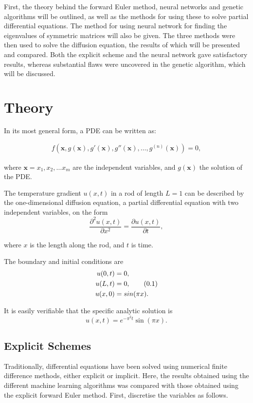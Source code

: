 \documentclass[multicolumn, 9pt]{extarticle}
\newcommand\numberthis{\addtocounter{equation}{1}\tag{\theequation}}
\begin{document}
First, the theory behind the forward Euler method, neural networks and genetic algorithms will be outlined, as well as the methods for using these to solve partial differential equations. The method for using neural network for finding the eigenvalues of symmetric matrices will also be given. The three methods were then used to solve the diffusion equation, the results of which will be presented and compared. Both the explicit scheme and the neural network gave satisfactory results, whereas substantial flaws were uncovered in the genetic algorithm, which will be discussed. 


\section{Theory}
In its most general form, a PDE can be written as: 

\begin{align}
\label{eq:f-cost}
	f(\mathbf{x}, g(\mathbf{x}), g'(\mathbf{x}), g''(\mathbf{x}), \dots, g^{(n)}(\mathbf{x})) = 0,
\end{align}

where $\mathbf{x} = x_1, x_2, \dots x_m$ are the independent variables, and $g(\mathbf{x})$ the solution of the PDE. 

The temperature gradient $u(x, t)$ in a rod of length $L=1$ can be described by the one-dimensional diffusion equation, a partial differential equation with two independent variables, on the form
\begin{equation}\label{eq:diff}
	\frac{\partial^2 u(x, t) }{\partial x^2} = \frac{\partial u(x, t)}{\partial t},
\end{equation}

where $x$ is the length along the rod, and $t$ is time. 


The boundary and initial conditions are
\begin{align*}\label{eq:boundary}
	u(0, t) & = 0,             \\
	u(L, t) & = 0, \numberthis \\
	u(x, 0) & = sin(\pi x).
\end{align*}

It is easily verifiable that the specific analytic solution is
\begin{equation}\label{eq:anal}
	u(x, t) = e^{-\pi^2t}\sin(\pi x).
\end{equation}

\subsection{Explicit Schemes}
Traditionally, differential equations have been solved using numerical finite difference methods, either explicit or implicit. Here, the results obtained using the different machine learning algorithms was compared with those obtained using the explicit forward Euler method. First, discretise the variables as follows.
\end{document}

